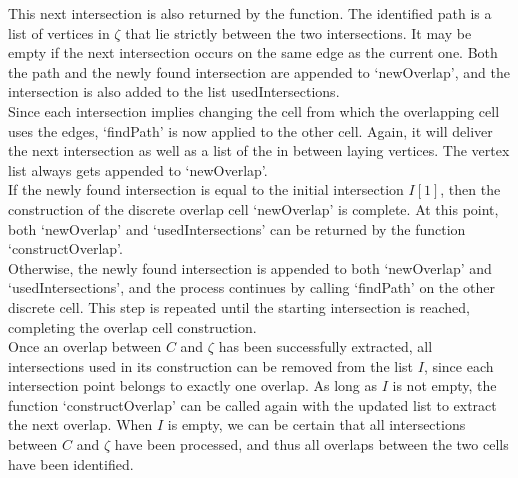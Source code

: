 This next intersection is also returned by the function. 
The identified path is a list of vertices in $\zeta$ that lie strictly between the two intersections. 
It may be empty if the next intersection occurs on the same edge as the current one. 
Both the path and the newly found intersection are appended to `newOverlap', and the intersection is also added to the list usedIntersections.\\
Since each intersection implies changing the cell from which the overlapping cell uses the edges, `findPath' is now applied to the other cell. 
Again, it will deliver the next intersection as well as a list of the in between laying vertices. 
The vertex list always gets appended to `newOverlap'. \\
If the newly found intersection is equal to the initial intersection $I[1]$, then the construction of the discrete overlap cell `newOverlap' is complete. 
At this point, both `newOverlap' and `usedIntersections' can be returned by the function `constructOverlap'. \\
Otherwise, the newly found intersection is appended to both `newOverlap' and `usedIntersections', and the process continues by calling `findPath' on the other discrete cell.   
This step is repeated until the starting intersection is reached, completing the overlap cell construction. \\
Once an overlap between $C$ and $\zeta$ has been successfully extracted, all intersections used in its construction can be removed from the list $I$, since each intersection point belongs to exactly one overlap. 
As long as $I$ is not empty, the function `constructOverlap' can be called again with the updated list to extract the next overlap. 
When $I$ is empty, we can be certain that all intersections between $C$ and $\zeta$ have been processed, and thus all overlaps between the two cells have been identified. \\

